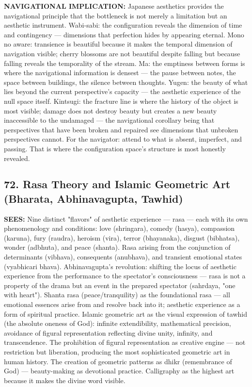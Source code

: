 \textbf{NAVIGATIONAL IMPLICATION:} Japanese aesthetics provides the navigational principle that the bottleneck is not merely a limitation but an aesthetic instrument. Wabi-sabi: the configuration reveals the dimension of time and contingency — dimensions that perfection hides by appearing eternal. Mono no aware: transience is beautiful because it makes the temporal dimension of navigation visible; cherry blossoms are not beautiful despite falling but because falling reveals the temporality of the stream. Ma: the emptiness between forms is where the navigational information is densest — the pause between notes, the space between buildings, the silence between thoughts. Yugen: the beauty of what lies beyond the current perspective's capacity — the aesthetic experience of the null space itself. Kintsugi: the fracture line is where the history of the object is most visible; damage does not destroy beauty but creates a new beauty inaccessible to the undamaged — the navigational corollary being that perspectives that have been broken and repaired see dimensions that unbroken perspectives cannot. For the navigator: attend to what is absent, imperfect, and passing. That is where the configuration space's structure is most honestly revealed.


\bigskip\noindent\makebox[\textwidth]{\color{rulegray}\rule{5cm}{0.3pt}}\bigskip


\subsection*{72. Rasa Theory and Islamic Geometric Art (Bharata, Abhinavagupta, Tawhid)}


\textbf{SEES:} Nine distinct "flavors" of aesthetic experience — rasa — each with its own phenomenology and conditions: love (shringara), comedy (hasya), compassion (karuna), fury (raudra), heroism (vira), terror (bhayanaka), disgust (bibhatsa), wonder (adbhuta), and peace (shanta). Rasa arising from the conjunction of determinants (vibhava), consequents (anubhava), and transient emotional states (vyabhicari bhava). Abhinavagupta's revolution: shifting the locus of aesthetic experience from the performance to the spectator's consciousness — rasa is not a property of the drama but an event in the prepared spectator (sahrdaya, "one with heart"). Shanta rasa (peace/\allowbreak tranquility) as the foundational rasa — all emotional essences arise from and resolve back into it; aesthetic experience as a form of spiritual practice. Islamic geometric art as the visual expression of tawhid (the absolute oneness of God): infinite extendibility, mathematical precision, avoidance of figural representation reflecting divine unity, infinity, and transcendence. The prohibition of figural representation as creative engine — not restriction but liberation, producing the most sophisticated geometric art in human history. The creation of geometric patterns as dhikr (remembrance of God) — beauty-making as devotional practice. Calligraphy as the highest art because it makes the divine word visible.


